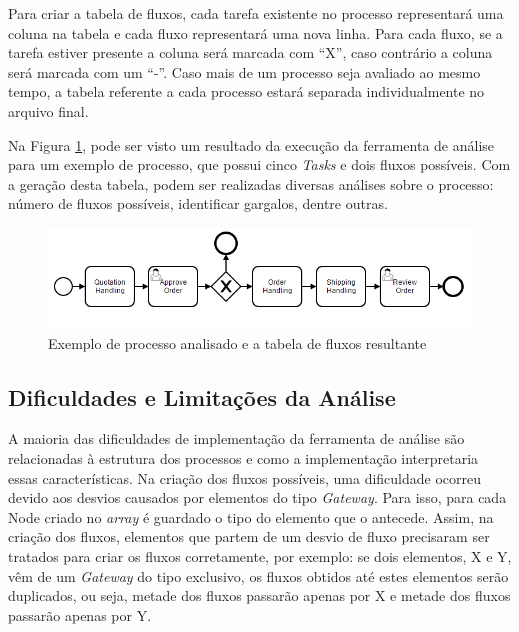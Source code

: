 \documentclass[12pt]{article}
\begin{document}
Para criar a tabela de fluxos, cada tarefa existente no processo representará uma coluna na tabela e cada fluxo representará uma nova linha. Para cada fluxo, se a tarefa estiver presente a coluna será marcada com ``X'', caso contrário a coluna será marcada com um ``-''. Caso mais de um processo seja avaliado ao mesmo tempo, a tabela referente a cada processo estará separada individualmente no arquivo final. 

Na Figura \ref{fig:diagram5}, pode ser visto um resultado da execução da ferramenta de análise para um exemplo de processo, que possui cinco \emph{Tasks} e dois fluxos possíveis. Com a geração desta tabela, podem ser realizadas diversas análises sobre o processo: número de fluxos possíveis, identificar gargalos, dentre outras.

\begin{figure}[ht]
\centering
\includegraphics[width=.9\textwidth]{figuras/diagram5.png}

\caption{Exemplo de processo analisado e a tabela de fluxos resultante}
\label{fig:diagram5}
\end{figure}



\subsection{Dificuldades e Limitações da Análise}

A maioria das dificuldades de implementação da ferramenta de análise são relacionadas à estrutura dos processos e como a implementação interpretaria essas características. Na criação dos fluxos possíveis, uma dificuldade ocorreu devido aos desvios causados por elementos do tipo \emph{Gateway}. Para isso, para cada Node criado no \emph{array} é guardado o tipo do elemento que o antecede. Assim, na criação dos fluxos, elementos que partem de um desvio de fluxo precisaram ser tratados para criar os fluxos corretamente, por exemplo: se dois elementos, X e Y, vêm de um \emph{Gateway} do tipo exclusivo, os fluxos obtidos até estes elementos serão duplicados, ou seja, metade dos fluxos passarão apenas por X e metade dos fluxos passarão apenas por Y.
\end{document}
